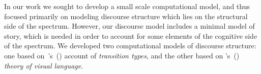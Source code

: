 In our work we sought to develop a small scale computational model, and thus focused primarily on modeling discourse structure which lies on the structural side of the spectrum. However, our discourse model includes a minimal model of story, which is needed in order to account for some elements of the cognitive side of the spectrum.  We developed two computational models of discourse structure: one based on~\citeauthor{mcCloud1993understanding}'s~(\citeyear{mcCloud1993understanding}) account of \emph{transition types}, and the other based on \citeauthor{cohn2013visual}'s~(\citeyear{cohn2013visual}) \emph{theory of visual language}.



